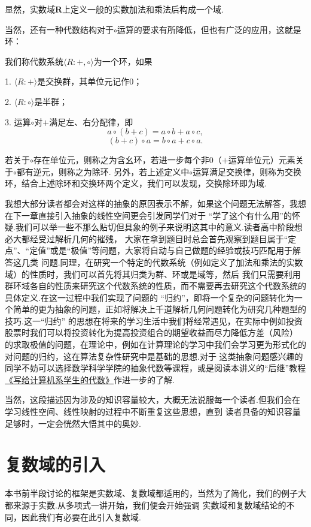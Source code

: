 显然，实数域$\mathbf{R}$上定义一般的实数加法和乘法后构成一个域.

当然，还有一种代数结构对于$\circ$运算的要求有所降低，但也有广泛的应用，这就是环：
\begin{definition}
	我们称代数系统$\langle R:+,\circ\rangle$为一个环，如果
	
	1. $\langle R:+\rangle$是交换群，其单位元记作0；

	2. $\langle R:\circ\rangle$是半群；

	3. 运算$\circ$对$+$满足左、右分配律，即
	$$a\circ(b+c)=a\circ b+a\circ c,$$
	$$(b+c)\circ a=b\circ a+c\circ a.$$
	
	若关于$\circ$存在单位元，则称之为含幺环，若进一步每个非0（$+$运算单位元）元素关于$\circ$都有逆元，则称之为除环.
	另外，若上述定义中$\circ$运算满足交换律，则称为交换环，结合上述除环和交换环两个定义，我们可以发现，交换除环即为域.
\end{definition}

我想大部分读者都会对这样的抽象的原因表示不解，如果这个问题无法解答，我想在下一章直接引入抽象的线性空间更会引发同学们对于
“学了这个有什么用”的怀疑.我们可以举一些不那么贴切但具象的例子来说明这其中的意义.读者高中阶段想必大都经受过解析几何的摧残，
大家在拿到题目时总会首先观察到题目属于“定点”、“定值”或是“极值”等问题，大家将自动与自己做题的经验或技巧匹配用于解答这几类
问题.同理，在研究一个特定的代数系统（例如定义了加法和乘法的实数域）的性质时，我们可以首先将其归类为群、环或是域等，然后
我们只需要利用群环域各自的性质来研究这个代数系统的性质，而不需要再去研究这个代数系统的具体定义.在这一过程中我们实现了问题的
“归约”，即将一个复杂的问题转化为一个简单的更为抽象的问题，正如将解决上千道解析几何问题转化为研究几种题型的技巧.这一“归约”
的思想在将来的学习生活中我们将经常遇见，在实际中例如投资股票时我们可以将投资转化为提高投资组合的期望收益而尽力降低方差（风险）
的求取极值的问题，在理论中，例如在计算理论的学习中我们会学习更为形式化的对问题的归约，这在算法复杂性研究中是基础的思想.对于
这类抽象问题感兴趣的同学不妨可以选择数学科学学院的抽象代数等课程，或是阅读本讲义的“后继”教程
\href{https://frightenedfoxcn.github.io/notes/series/alg-for-cs/}{《写给计算机系学生的代数》}作进一步的了解.

当然，这段描述因为涉及的知识容量较大，大概无法说服每一个读者.但我们会在学习线性空间、线性映射的过程中不断重复这些思想，直到
读者具备的知识容量足够时，一定会恍然大悟其中的奥妙.

\section{复数域的引入}
本书前半段讨论的框架是实数域、复数域都适用的，当然为了简化，我们的例子大都来源于实数.从多项式一讲开始，我们便会开始强调
实数域和复数域结论的不同，因此我们有必要在此引入复数域.

